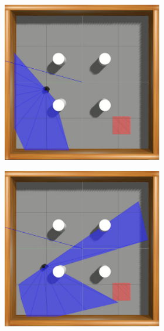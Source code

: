 \begin{figure}[H]
\caption{Imagens sequência no segundo ambiente simulado do experimento}
    \begin{center}
    \begin{subfigure}[b]{0.60\textwidth}
        \begin{subfigure}[b]{0.24\textwidth}
            \includegraphics[width=\textwidth]{imagens/simulated_envs/sim_env2_ddpg/1.png}
        \end{subfigure}
        \hfill
        \begin{subfigure}[b]{0.24\textwidth}
            \includegraphics[width=\textwidth]{imagens/simulated_envs/sim_env2_ddpg/2.png}

\end{subfigure}
\end{subfigure}
\end{center}
\end{figure}
